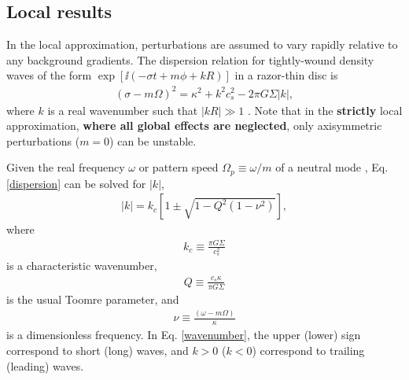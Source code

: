 



\subsection{Local results}\label{local_approx}
In the local approximation, perturbations are assumed to vary rapidly
relative to any background gradients. The
dispersion relation for tightly-wound density 
waves of the form $\exp{[\ii(-\sigma t + m \phi + kR)]}$ in a razor-thin
disc is  
\begin{align}\label{dispersion}
  (\sigma - m\Omega)^2 = \kappa^2 + k^2c_s^2 - 2\pi G \Sigma |k|, 
\end{align}
where $k$ is a real wavenumber such that $|kR|\gg1$ \citep{shu91}. 
Note that in the {\bf strictly} local approximation, {\bf where all
  global effects are neglected}, only axisymmetric perturbations
($m=0$) can be unstable. %

Given the real frequency $\omega$ or pattern speed $\Omega_p\equiv  
\omega/m$ of a neutral mode 
, Eq. \ref{dispersion} can be solved 
for $|k|$, 
\begin{align}\label{wavenumber}
|k| = k_c\left[1 \pm \sqrt{1 -
     Q^2(1-\nu^2)}\right], 
\end{align}
where 
 \begin{align}
   k_c \equiv \frac{\pi G \Sigma}{c_s^2}
 \end{align}
 is a characteristic wavenumber, 
\begin{align}
  Q \equiv \frac{c_s\kappa}{\pi G \Sigma}
\end{align}
is the usual Toomre parameter, and
\begin{align}
  \nu \equiv \frac{(\omega - m\Omega)}{\kappa}
\end{align}
is a dimensionless frequency. In
Eq. \ref{wavenumber}, the upper (lower) sign correspond to short
(long) waves, and $k>0$ ($k<0$) correspond to trailing (leading)
waves.    

